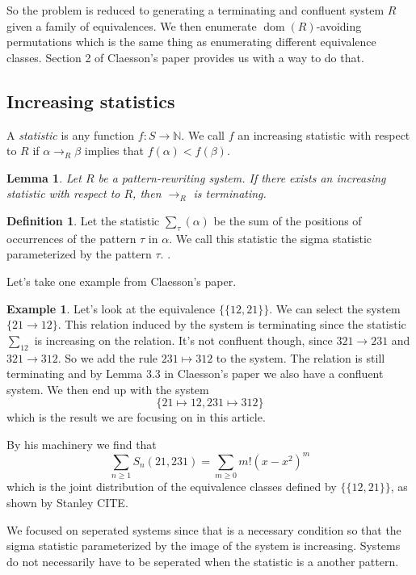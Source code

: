 \documentclass[a4paper, 11pt, english]{article}
\newcommand{\patternrule}{ \mapsto \!}
\newtheorem{lemma}[theorem]{Lemma}
\theoremstyle{definition}
\newtheorem{definition}[theorem]{Definition}
\newtheorem{example}[theorem]{Example}
\newcommand{\Sym}{S}
\DeclareMathOperator{\dom}{dom}
\begin{document}
So the problem is reduced to generating a terminating and confluent system $R$
given a family of equivalences. We then enumerate $\dom(R)$-avoiding
permutations which is the same thing as enumerating different equivalence
classes.  Section 2 of Claesson's paper provides us with a way to do that.
\cite{claesson:2021}

\subsection{Increasing statistics}
A \emph{statistic} is any function $f : \Sym \to \mathbb{N}$. We call $f$ an increasing
statistic with respect to $R$ if $\alpha \to_R \beta$ implies that $f(\alpha) < f(\beta)$.

\begin{lemma}
    Let $R$ be a pattern-rewriting system. If there exists an increasing
    statistic with respect to $R$, then $\to_R$ is terminating.    
\end{lemma}

\begin{definition}
    Let the statistic $\sum_\tau(\alpha)$ be the sum of the positions of occurrences of
    the pattern $\tau$ in $\alpha$. We call this statistic the sigma statistic
    parameterized by the pattern $\tau$.
    \cite{claesson:2021}.
\end{definition}


Let's take one example from Claesson's paper.
\begin{example}
    Let's look at the equivalence $\{ \{ 12, 21 \} \}$. We can select the system $\{
        21 \to 12 \}$. This relation induced by the system is terminating since the statistic
    $\sum_{12}$ is increasing on the relation. It's not
    confluent though, since $321 \to 231$ and $321 \to 312$. So we add the rule
    $231 \patternrule 312$ to the system. The relation is still terminating and by Lemma
    3.3 in Claesson's paper we also have a confluent system. We then end up with
    the system 
    \[
        \{ 21 \patternrule 12, 231 \patternrule 312 \}
    \]
    which is the result we are focusing on in this article.

    By his machinery we find that 
    \[
        \sum_{n \geq 1} \Sym_n(21, 231) = \sum_{m \geq 0} m!(x-x^2)^m
    \]
    which is the joint distribution of the equivalence classes defined by 
    $\{ \{ 12, 21 \} \}$, as shown by Stanley CITE.
\end{example}

We focused on seperated systems since that is a necessary condition so that the sigma statistic
parameterized by the image of the system is increasing. Systems do not necessarily have to be
seperated when the statistic is a another pattern.
\end{document}
